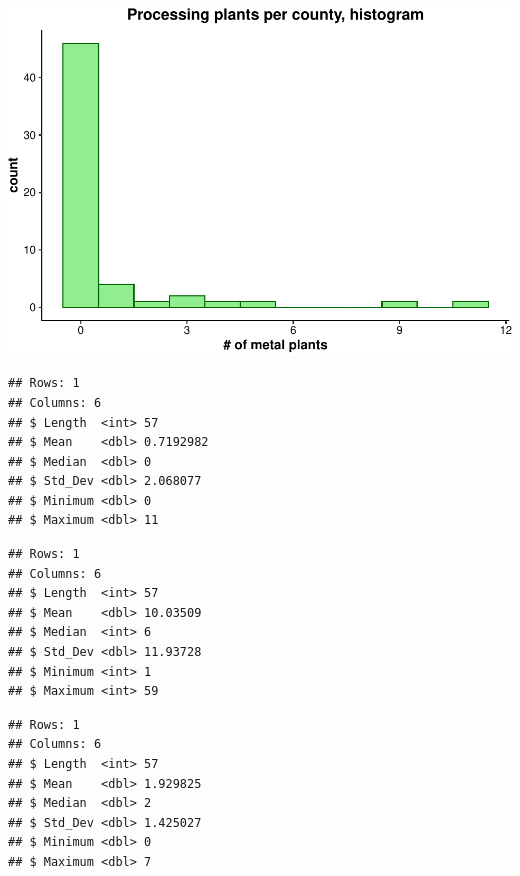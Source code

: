 \documentclass[
  12pt,
]{article}
\begin{document}
\includegraphics{Alcorn_Bao_Hermanson_ENV872_Project_files/figure-latex/setuping section-3.pdf}

\begin{verbatim}
## Rows: 1
## Columns: 6
## $ Length  <int> 57
## $ Mean    <dbl> 0.7192982
## $ Median  <dbl> 0
## $ Std_Dev <dbl> 2.068077
## $ Minimum <dbl> 0
## $ Maximum <dbl> 11
\end{verbatim}

\begin{verbatim}
## Rows: 1
## Columns: 6
## $ Length  <int> 57
## $ Mean    <dbl> 10.03509
## $ Median  <int> 6
## $ Std_Dev <dbl> 11.93728
## $ Minimum <int> 1
## $ Maximum <int> 59
\end{verbatim}

\begin{verbatim}
## Rows: 1
## Columns: 6
## $ Length  <int> 57
## $ Mean    <dbl> 1.929825
## $ Median  <dbl> 2
## $ Std_Dev <dbl> 1.425027
## $ Minimum <dbl> 0
## $ Maximum <dbl> 7
\end{verbatim}
\end{document}
